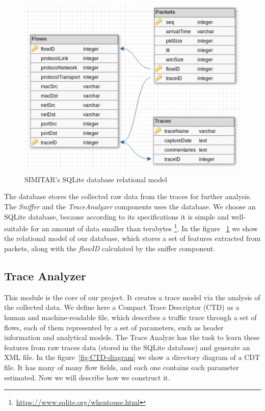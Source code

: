 \begin{figure}[ht!]
        \centering
        \includegraphics[width=\linewidth]{figures/database-relational-model}
        \caption{SIMITAR's SQLite database relational model}
    \label{fig:simitar-database}
\end{figure}


The database stores the collected raw data from the traces for further analysis. The \textit{Sniffer} and the \textit{TraceAnalyzer} components uses the database.  We choose an SQLite database, because according to its specifications it is simple and well-suitable for an amount of data smaller than terabytes \footnote{\href{https://www.sqlite.org/whentouse.html}{https://www.sqlite.org/whentouse.html}}. In the figure ~\ref{fig:simitar-database} we show the relational model of our database, which stores a set of features extracted from packets, along with the \textit{flowID} calculated by the sniffer component. 


\subsection{Trace Analyzer}


This module is the core of our project. It creates a trace model via the analysis of the collected data. We define here a Compact Trace Descriptor (CTD) as a human and machine-readable file, which describes a traffic trace through a set of flows, each of them represented by a set of parameters, such as header information and analytical models.  The Trace Analyze has the task to learn these features from raw traces data (stored in the SQLite database) and generate an XML file.  In the figure~\ref{fig:CTD-diagram} we show a directory diagram of a CDT file. It has many of many flow fields, and each one contains each parameter estimated. Now we will describe how we construct it. 

